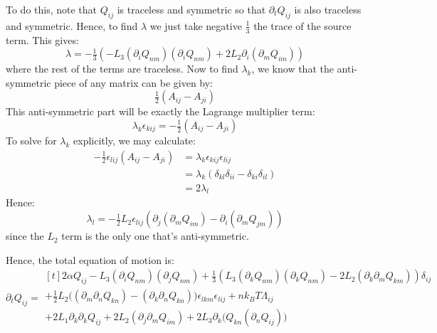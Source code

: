 \documentclass[reqno]{article}
\begin{document}
	To do this, note that $Q_{ij}$ is traceless and symmetric so that $\partial_t Q_{ij}$ is also traceless and symmetric.
	Hence, to find $\lambda$ we just take negative $\tfrac13$ the trace of the source term.
	This gives:
	\begin{equation}
		\lambda
		= -\tfrac13 \left(
		- L_3 (\partial_i Q_{nm}) (\partial_i Q_{nm})
		+ 2 L_2 \partial_i ( \partial_m Q_{im} )
		\right)
	\end{equation}
	where the rest of the terms are traceless.
	Now to find $\lambda_k$, we know that the anti-symmetric piece of any matrix can be given by:
	\begin{equation}
		\tfrac12 \left( A_{ij} - A_{ji} \right)
	\end{equation}
	This anti-symmetric part will be exactly the Lagrange multiplier term:
	\begin{equation}
		\lambda_k \epsilon_{kij} = -\tfrac12 \left( A_{ij} - A_{ji} \right)
	\end{equation}
	To solve for $\lambda_k$ explicitly, we may calculate:
	\begin{equation}
	\begin{split}
		-\tfrac12 \epsilon_{lij} \left( A_{ij} - A_{ji} \right)
		&= \lambda_k \epsilon_{kij} \epsilon_{lij} \\
		&= \lambda_k \left( \delta_{kl} \delta_{ii} - \delta_{ki} \delta_{il} \right) \\
		&= 2 \lambda_l
	\end{split}
	\end{equation}
	Hence:
	\begin{equation}
		\lambda_l = -\tfrac12 L_2 \epsilon_{lij} \left( \partial_j (\partial_m Q_{im}) - \partial_i (\partial_m Q_{jm}) \right)
	\end{equation}
	since the $L_2$ term is the only one that's anti-symmetric.
	
	Hence, the total equation of motion is:
	\begin{equation}
		\partial_t Q_{ij}
		=
		\begin{multlined}[t]
		2 \alpha Q_{ij}
		- L_3 (\partial_i Q_{nm}) (\partial_j Q_{nm}) 
		+ \tfrac13 \left( L_3 (\partial_k Q_{nm})(\partial_k Q_{nm}) 
		- 2 L_2 (\partial_k \partial_m Q_{km}) \right) \delta_{ij} \\
		+ \tfrac12 L_2 \bigl( (\partial_m \partial_n Q_{kn}) - (\partial_k \partial_n Q_{kn} ) \bigr) \epsilon_{lkm} \epsilon_{lij}
		+ n k_B T \Lambda_{ij} \\
		+ 2 L_1 \partial_k \partial_k Q_{ij} 
		+ 2 L_2 (\partial_j \partial_m Q_{im})
		+ 2 L_3 \partial_k \bigl( Q_{kn} (\partial_n Q_{ij}) \bigr)
		\end{multlined}
	\end{equation}
	
\end{document}
